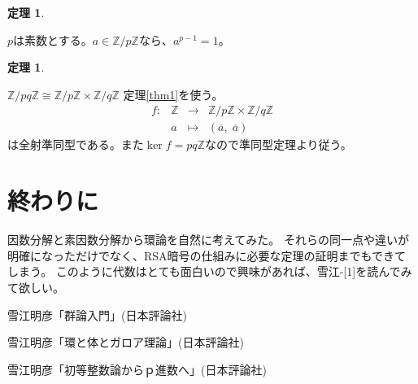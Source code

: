 \documentclass{jsarticle}
\newtheorem{thm}[definition]{定理}
\begin{document}
\begin{thm}
\end{thm}
$p$は素数とする。$a\in \mathbb{Z}/p\mathbb{Z}$なら、$a^{p-1}=1$。
\begin{thm}
\end{thm}
$\mathbb{Z}/pq\mathbb{Z}\cong \mathbb{Z}/p\mathbb{Z}\times \mathbb{Z}/q\mathbb{Z}$
\proof
定理\ref{thm1}を使う。\\
\begin{equation*}
    \begin{array}{rccc}
        f\colon &\mathbb{Z} &\longrightarrow & \mathbb{Z}/p\mathbb{Z}\times \mathbb{Z}/q\mathbb{Z}\\
                  &a & \longmapsto    &\left( \overline{a},\; \overline{a}\right)
    \end{array}
\end{equation*}
は全射準同型である。また$\ker{f}=pq\mathbb{Z}$なので準同型定理より従う。
\section{終わりに}
因数分解と素因数分解から環論を自然に考えてみた。
それらの同一点や違いが明確になっただけでなく、RSA暗号の仕組みに必要な定理の証明までもできてしまう。
このように代数はとても面白いので興味があれば、雪江-[1]を読んでみて欲しい。

\begin{thebibliography}{99}
    \item 雪江明彦「群論入門」(日本評論社)
    \item 雪江明彦「環と体とガロア理論」(日本評論社)
    \item 雪江明彦「初等整数論からｐ進数へ」(日本評論社)
\end{thebibliography}
\end{document}
